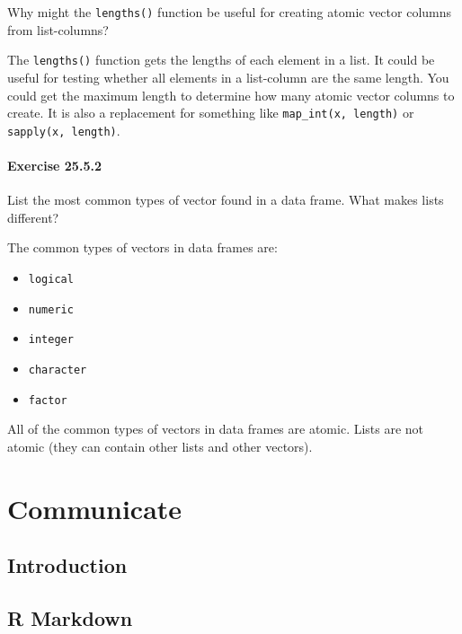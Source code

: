 \documentclass[]{book}
\providecommand{\tightlist}{%
  \setlength{\itemsep}{0pt}\setlength{\parskip}{0pt}}
\theoremstyle{plain}
\theoremstyle{remark}
\begin{document}
Why might the \texttt{lengths()} function be useful for creating atomic
vector columns from list-columns?

The \texttt{lengths()} function gets the lengths of each element in a
list. It could be useful for testing whether all elements in a
list-column are the same length. You could get the maximum length to
determine how many atomic vector columns to create. It is also a
replacement for something like \texttt{map\_int(x,\ length)} or
\texttt{sapply(x,\ length)}.

\hypertarget{exercise-25.5.2}{%
\subsection*{\texorpdfstring{Exercise
{25.5.2}}{Exercise 25.5.2}}\label{exercise-25.5.2}}

List the most common types of vector found in a data frame. What makes
lists different?

The common types of vectors in data frames are:

\begin{itemize}
\tightlist
\item
  \texttt{logical}
\item
  \texttt{numeric}
\item
  \texttt{integer}
\item
  \texttt{character}
\item
  \texttt{factor}
\end{itemize}

All of the common types of vectors in data frames are atomic. Lists are
not atomic (they can contain other lists and other vectors).

\hypertarget{part-communicate}{%
\part{Communicate}\label{part-communicate}}

\hypertarget{communicate-intro}{%
\chapter{Introduction}\label{communicate-intro}}

\hypertarget{r-markdown}{%
\chapter{R Markdown}\label{r-markdown}}
\end{document}

